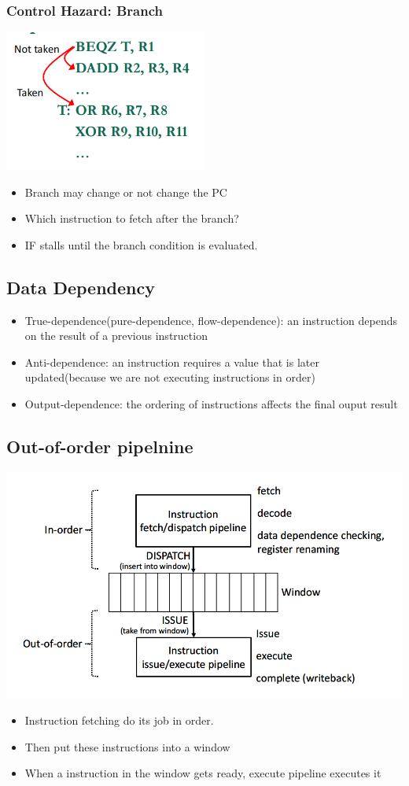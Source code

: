 \documentclass[12pt]{article}
\begin{document}
\subsubsection{Control Hazard: Branch}
\includegraphics[width=0.5\textwidth]{ControlHazard.png}
\begin{itemize}
    \item Branch may change or not change the PC
    \item Which instruction to fetch after the branch?
    \item IF stalls until the branch condition is evaluated.
\end{itemize}
\subsection{Data Dependency}
\begin{itemize}
    \item True-dependence(pure-dependence, flow-dependence): an instruction depends on the result of a previous instruction
    \item Anti-dependence: an instruction requires a value that is later updated(because we are not executing instructions in order)
    \item Output-dependence: the ordering of instructions affects the final ouput result
\end{itemize}
\subsection{Out-of-order pipelnine}
\includegraphics[width=\textwidth]{Out-of-orderPipelnine.png}
\begin{itemize}
    \item Instruction fetching do its job in order.
    \item Then put these instructions into a window
    \item When a instruction in the window gets ready, execute pipeline executes it
\end{itemize}
\end{document}
